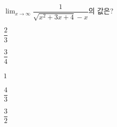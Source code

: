 $\displaystyle\lim_{x\to\infty} \dfrac{1}{\sqrt{x^2+3x+4}-x}$의 값은?
\begin{choices32}{\rule[-3ex]{0pt}{8ex}$\dfrac{2}{3}$}{\rule[-3ex]{0pt}{8ex}$\dfrac{3}{4}$}{\rule[-3ex]{0pt}{8ex}$1$}{\rule[-3ex]{0pt}{8ex}$\dfrac{4}{3}$}{\rule[-3ex]{0pt}{8ex}$\dfrac{3}{2}$}\end{choices32}
